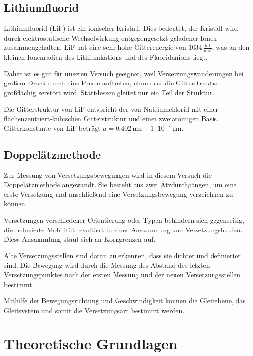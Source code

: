 \documentclass[12pt,a4paper]{scrartcl}
\numberwithin{equation}{section} %
\begin{document}
\hypertarget{lithiumfluorid}{%
\subsection{Lithiumfluorid}\label{lithiumfluorid}}

Lithiumfluorid ($\mathrm{LiF}$) ist ein ionischer Kristall. Dies
bedeutet, der Kristall wird durch elektrostatische Wechselwirkung
entgegengesetzt geladener Ionen zusammengehalten. $\mathrm{LiF}$
hat eine sehr hohe Gitterenergie von $1034\mathrm{\,\frac{kJ}{mol}}$,
was an den kleinen Ionenradien des Lithiumkations und des Fluoridanions
liegt.

Daher ist es gut für unseren Versuch geeignet, weil
Versetzungswanderungen bei großem Druck durch eine Presse auftreten,
ohne dass die Gitterstruktur großflächig zerstört wird. Stattdessen
gleitet nur ein Teil der Struktur.

Die Gitterstruktur von $\mathrm{LiF}$ entspricht der von
Natriumchlorid mit einer flächenzentriert-kubischen Gitterstruktur und
einer zweiatomigen Basis. Gitterkonstante von $\mathrm{LiF}$ beträgt
$a=0.402\mathrm{\,nm}\pm 1 \cdot 10^{-7} \mathrm{\, \mu m}$. \cite{Uni}

\hypertarget{doppeluxe4tzmethode}{%
\subsection{Doppelätzmethode}\label{doppeluxe4tzmethode}}

Zur Messung von Versetzungsbewegungen wird in diesem Versuch die
Doppelätzmethode angewandt. Sie besteht aus zwei Ätzdurchgängen, um eine
erste Versetzung und anschließend eine Versetzungsbewegung verzeichnen
zu können.

Versetzungen verschiedener Orientierung oder Typen behindern sich
gegenseitig, die reduzierte Mobilität resultiert in einer Ansammlung von
Versetzungshaufen. Diese Ansammlung staut sich an Korngrenzen auf.

Alte Versetzungsstellen sind daran zu erkennen, dass sie dichter
und definierter sind. Die Bewegung wird durch die Messung des Abstand
des letzten Versetzungspunktes nach der ersten Messung und der neuen
Versetzungsstellen bestimmt.

Mithilfe der Bewegungsrichtung und Geschwindigkeit können die
Gleitebene, das Gleitsystem und somit die Versetzungsart bestimmt
werden.

\newpage
\hypertarget{theoretische-grundlagen}{%
\section{Theoretische Grundlagen}\label{theoretische-grundlagen}}
\end{document}
